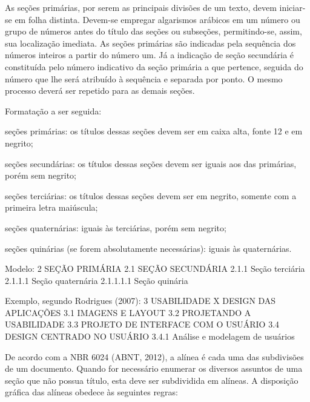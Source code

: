 \begin{Desenvolvimento}
As seções primárias, por serem as principais divisões de um texto, devem iniciar-se em folha distinta. Devem-se empregar algarismos arábicos em um número ou grupo de números antes do título das seções ou subseções, permitindo-se, assim, sua localização imediata. As seções primárias são indicadas pela sequência dos números inteiros a partir do número um. Já a indicação de seção secundária é constituída pelo número indicativo da seção primária a que pertence, seguida do número que lhe será atribuído à sequência e separada por ponto. O mesmo processo deverá ser repetido para as demais seções.

Formatação a ser seguida:

\begin{alinea}
  \item seções primárias: os títulos dessas seções devem ser em caixa alta, fonte 12 e em negrito;
  \item seções secundárias: os títulos dessas seções devem ser iguais aos das primárias, porém sem negrito;
  \item seções terciárias: os títulos dessas seções devem ser em negrito, somente com a primeira letra maiúscula;
  \item seções quaternárias: iguais às terciárias, porém sem negrito;
  \item seções quinárias (se forem absolutamente necessárias): iguais às quaternárias.
\end{alinea}

Modelo:
2 SEÇÃO PRIMÁRIA
2.1 SEÇÃO SECUNDÁRIA
2.1.1 Seção terciária
2.1.1.1 Seção quaternária
2.1.1.1.1 Seção quinária

Exemplo, segundo Rodrigues (2007):
3 USABILIDADE X DESIGN DAS APLICAÇÕES
3.1 IMAGENS E LAYOUT
3.2 PROJETANDO A USABILIDADE
3.3 PROJETO DE INTERFACE COM O USUÁRIO
3.4 DESIGN CENTRADO NO USUÁRIO
3.4.1 Análise e modelagem de usuários

De acordo com a NBR 6024 (ABNT, 2012), a alínea é cada uma das subdivisões de um documento. Quando for necessário enumerar os diversos assuntos de uma seção que não possua título, esta deve ser subdividida em alíneas. A disposição gráfica das alíneas obedece às seguintes regras:


\end{Desenvolvimento}

